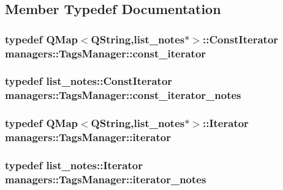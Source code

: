 \subsection{Member Typedef Documentation}
\hypertarget{classmanagers_1_1_tags_manager_a6f717302ace6d00a4b8b97b60fa596f8}{
\subsubsection[{const\-\_\-iterator}]{\setlength{\rightskip}{0pt plus 5cm}typedef Q\-Map$<$Q\-String,list\-\_\-notes$\ast$$>$\-::Const\-Iterator {\bf managers\-::\-Tags\-Manager\-::const\-\_\-iterator}}}\label{classmanagers_1_1_tags_manager_a6f717302ace6d00a4b8b97b60fa596f8}
\hypertarget{classmanagers_1_1_tags_manager_afb8b7b6090c26853946b86b557986d17}{
\subsubsection[{const\-\_\-iterator\-\_\-notes}]{\setlength{\rightskip}{0pt plus 5cm}typedef list\-\_\-notes\-::\-Const\-Iterator {\bf managers\-::\-Tags\-Manager\-::const\-\_\-iterator\-\_\-notes}}}\label{classmanagers_1_1_tags_manager_afb8b7b6090c26853946b86b557986d17}
\hypertarget{classmanagers_1_1_tags_manager_a7064c805f49f35cd2508b420b3bf00ed}{
\subsubsection[{iterator}]{\setlength{\rightskip}{0pt plus 5cm}typedef Q\-Map$<$Q\-String,list\-\_\-notes$\ast$$>$\-::Iterator {\bf managers\-::\-Tags\-Manager\-::iterator}}}\label{classmanagers_1_1_tags_manager_a7064c805f49f35cd2508b420b3bf00ed}
\hypertarget{classmanagers_1_1_tags_manager_a9d5b2971266b5836d80801a1ed2a8517}{
\subsubsection[{iterator\-\_\-notes}]{\setlength{\rightskip}{0pt plus 5cm}typedef list\-\_\-notes\-::\-Iterator {\bf managers\-::\-Tags\-Manager\-::iterator\-\_\-notes}}}\label{classmanagers_1_1_tags_manager_a9d5b2971266b5836d80801a1ed2a8517}


